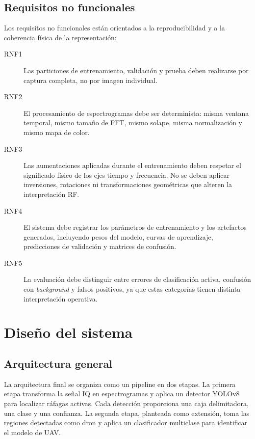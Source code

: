 \subsection{Requisitos no funcionales}

Los requisitos no funcionales están orientados a la reproducibilidad y a la coherencia física de la representación:

\begin{description}
  \item[RNF1] Las particiones de entrenamiento, validación y prueba deben realizarse por captura completa, no por imagen individual.
  \item[RNF2] El procesamiento de espectrogramas debe ser determinista: misma ventana temporal, mismo tamaño de FFT, mismo solape, misma normalización y mismo mapa de color.
  \item[RNF3] Las aumentaciones aplicadas durante el entrenamiento deben respetar el significado físico de los ejes tiempo y frecuencia. No se deben aplicar inversiones, rotaciones ni transformaciones geométricas que alteren la interpretación RF.
  \item[RNF4] El sistema debe registrar los parámetros de entrenamiento y los artefactos generados, incluyendo pesos del modelo, curvas de aprendizaje, predicciones de validación y matrices de confusión.
  \item[RNF5] La evaluación debe distinguir entre errores de clasificación activa, confusión con \emph{background} y falsos positivos, ya que estas categorías tienen distinta interpretación operativa.
\end{description}

\section{Diseño del sistema}
\label{sec:diseno}

\subsection{Arquitectura general}
\label{subsec:arquitectura_general}

La arquitectura final se organiza como un pipeline en dos etapas. La primera etapa transforma la señal IQ en espectrogramas y aplica un detector YOLOv8 para localizar ráfagas activas. Cada detección proporciona una caja delimitadora, una clase y una confianza. La segunda etapa, planteada como extensión, toma las regiones detectadas como dron y aplica un clasificador multiclase para identificar el modelo de UAV.

